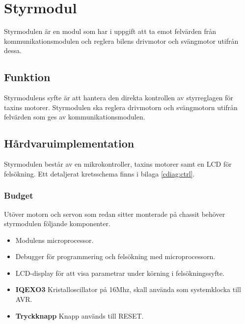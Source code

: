 \documentclass[designspec/spec.tex]{subfiles}
\begin{document}
\section{Styrmodul}
Styrmodulen är en modul som har i uppgift att ta emot felvärden från
kommunikationsmodulen och reglera bilens drivmotor och svängmotor utifrån
dessa.

\subsection{Funktion}
Styrmodulens syfte är att hantera den direkta kontrollen av styrreglagen för
taxins motorer. Styrmodulen ska reglera drivmotorn och svängmotorn utifrån
felvärden som ges av kommunikationsmodulen.

\subsection{Hårdvaruimplementation}
Styrmodulen består av en mikrokontroller, taxins motorer samt en LCD för
felsökning. Ett detaljerat kretsschema finns i bilaga \ref{cdiag:ctrl}.

\subsubsection{Budget}
Utöver motorn och servon som redan sitter monterade på chassit behöver
styrmodulen följande komponenter.
\begin{itemize}
	\item \textbf{\modMicrocontroller} Modulens microprocessor. 
    \item \textbf{\modJtag} Debugger för programmering och felsökning med
        microprocessorn. 
    \item \textbf{\modLcd} LCD-display för att visa parametrar under körning i
        felsökningssyfte.
    \item \textbf{IQEXO3} Kristalloscillator på 16Mhz, skall använda som systemklocka till AVR.
    \item \textbf{Tryckknapp} Knapp används till RESET.
\end{itemize}
\end{document}
